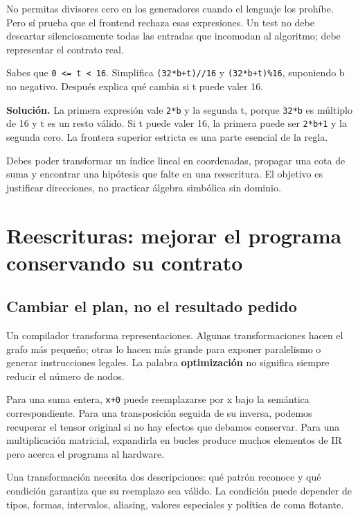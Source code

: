\documentclass[12pt,a4paper,oneside]{report}
\begin{document}
No permitas divisores cero en los generadores cuando el lenguaje los prohíbe. Pero sí prueba que el frontend rechaza esas expresiones. Un test no debe descartar silenciosamente todas las entradas que incomodan al algoritmo; debe representar el contrato real.

\begin{practica}
Sabes que \texttt{0 <= t < 16}. Simplifica \texttt{(32*b+t)//16} y \texttt{(32*b+t)\%16}, suponiendo b no negativo. Después explica qué cambia si t puede valer 16.

\end{practica}
\textbf{Solución.} La primera expresión vale \texttt{2*b} y la segunda t, porque \texttt{32*b} es múltiplo de 16 y t es un resto válido. Si t puede valer 16, la primera puede ser \texttt{2*b+1} y la segunda cero. La frontera superior estricta es una parte esencial de la regla.

\begin{comprueba}
Debes poder transformar un índice lineal en coordenadas, propagar una cota de suma y encontrar una hipótesis que falte en una reescritura. El objetivo es justificar direcciones, no practicar álgebra simbólica sin dominio.

\end{comprueba}
\chapter{Reescrituras: mejorar el programa conservando su contrato}
\label{ch:rewrites}
\section{Cambiar el plan, no el resultado pedido}
Un compilador transforma representaciones. Algunas transformaciones hacen el grafo más pequeño; otras lo hacen más grande para exponer paralelismo o generar instrucciones legales. La palabra \textbf{optimización} no significa siempre reducir el número de nodos.

Para una suma entera, \texttt{x+0} puede reemplazarse por x bajo la semántica correspondiente. Para una transposición seguida de su inversa, podemos recuperar el tensor original si no hay efectos que debamos conservar. Para una multiplicación matricial, expandirla en bucles produce muchos elementos de IR pero acerca el programa al hardware.

Una transformación necesita dos descripciones: qué patrón reconoce y qué condición garantiza que su reemplazo sea válido. La condición puede depender de tipos, formas, intervalos, aliasing, valores especiales y política de coma flotante.
\end{document}
